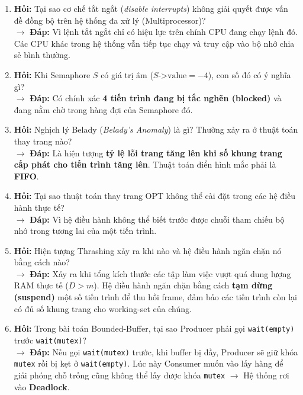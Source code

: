\documentclass[11pt,a4paper]{article}
\begin{document}
\begin{enumerate}
    \item \textbf{Hỏi:} Tại sao cơ chế tắt ngắt (\textit{disable interrupts}) không giải quyết được vấn đề đồng bộ trên hệ thống đa xử lý (Multiprocessor)?\\
    $\rightarrow$ \textbf{Đáp:} Vì lệnh tắt ngắt chỉ có hiệu lực trên chính CPU đang chạy lệnh đó. Các CPU khác trong hệ thống vẫn tiếp tục chạy và truy cập vào bộ nhớ chia sẻ bình thường.
    
    \item \textbf{Hỏi:} Khi Semaphore $S$ có giá trị âm ($S\text{->value} = -4$), con số đó có ý nghĩa gì?\\
    $\rightarrow$ \textbf{Đáp:} Có chính xác \textbf{4 tiến trình đang bị tắc nghẽn (blocked)} và đang nằm chờ trong hàng đợi của Semaphore đó.
    
    \item \textbf{Hỏi:} Nghịch lý Belady (\textit{Belady's Anomaly}) là gì? Thường xảy ra ở thuật toán thay trang nào?\\
    $\rightarrow$ \textbf{Đáp:} Là hiện tượng \textbf{tỷ lệ lỗi trang tăng lên khi số khung trang cấp phát cho tiến trình tăng lên}. Thuật toán điển hình mắc phải là \textbf{FIFO}.
    
    \item \textbf{Hỏi:} Tại sao thuật toán thay trang OPT không thể cài đặt trong các hệ điều hành thực tế?\\
    $\rightarrow$ \textbf{Đáp:} Vì hệ điều hành không thể biết trước được chuỗi tham chiếu bộ nhớ trong tương lai của một tiến trình.
    
    \item \textbf{Hỏi:} Hiện tượng Thrashing xảy ra khi nào và hệ điều hành ngăn chặn nó bằng cách nào?\\
    $\rightarrow$ \textbf{Đáp:} Xảy ra khi tổng kích thước các tập làm việc vượt quá dung lượng RAM thực tế ($D > m$). Hệ điều hành ngăn chặn bằng cách \textbf{tạm dừng (suspend)} một số tiến trình để thu hồi frame, đảm bảo các tiến trình còn lại có đủ số khung trang cho working-set của chúng.
    
    \item \textbf{Hỏi:} Trong bài toán Bounded-Buffer, tại sao Producer phải gọi \texttt{wait(empty)} trước \texttt{wait(mutex)}?\\
    $\rightarrow$ \textbf{Đáp:} Nếu gọi \texttt{wait(mutex)} trước, khi buffer bị đầy, Producer sẽ giữ khóa \texttt{mutex} rồi bị kẹt ở \texttt{wait(empty)}. Lúc này Consumer muốn vào lấy hàng để giải phóng chỗ trống cũng không thể lấy được khóa \texttt{mutex} $\rightarrow$ Hệ thống rơi vào \textbf{Deadlock}.
\end{enumerate}
\end{document}
